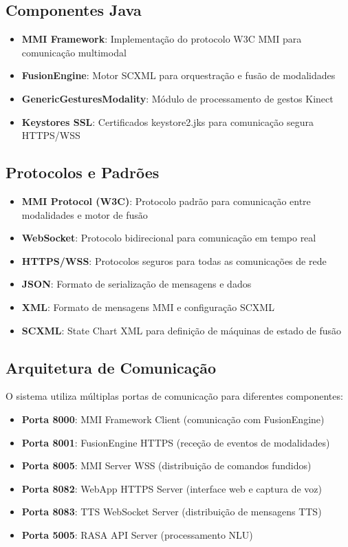 \subsection{Componentes Java}

\begin{itemize}
    \item \textbf{MMI Framework}: Implementação do protocolo W3C MMI para comunicação multimodal
    \item \textbf{FusionEngine}: Motor SCXML para orquestração e fusão de modalidades
    \item \textbf{GenericGesturesModality}: Módulo de processamento de gestos Kinect
    \item \textbf{Keystores SSL}: Certificados keystore2.jks para comunicação segura HTTPS/WSS
\end{itemize}

\subsection{Protocolos e Padrões}

\begin{itemize}
    \item \textbf{MMI Protocol (W3C)}: Protocolo padrão para comunicação entre modalidades e motor de fusão
    \item \textbf{WebSocket}: Protocolo bidirecional para comunicação em tempo real
    \item \textbf{HTTPS/WSS}: Protocolos seguros para todas as comunicações de rede
    \item \textbf{JSON}: Formato de serialização de mensagens e dados
    \item \textbf{XML}: Formato de mensagens MMI e configuração SCXML
    \item \textbf{SCXML}: State Chart XML para definição de máquinas de estado de fusão
\end{itemize}

\subsection{Arquitetura de Comunicação}

O sistema utiliza múltiplas portas de comunicação para diferentes componentes:

\begin{itemize}
    \item \textbf{Porta 8000}: MMI Framework Client (comunicação com FusionEngine)
    \item \textbf{Porta 8001}: FusionEngine HTTPS (receção de eventos de modalidades)
    \item \textbf{Porta 8005}: MMI Server WSS (distribuição de comandos fundidos)
    \item \textbf{Porta 8082}: WebApp HTTPS Server (interface web e captura de voz)
    \item \textbf{Porta 8083}: TTS WebSocket Server (distribuição de mensagens TTS)
    \item \textbf{Porta 5005}: RASA API Server (processamento NLU)
\end{itemize}

